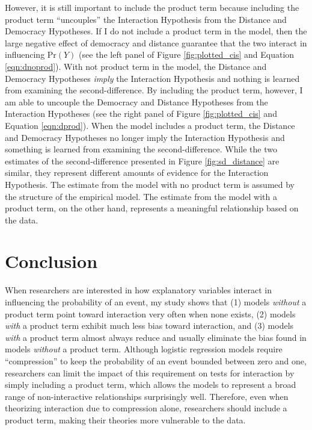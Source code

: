 \documentclass[12pt]{article}
\begin{document}
However, it is still important to include the product term because including the product term ``uncouples'' the Interaction Hypothesis from the Distance and Democracy Hypotheses. If I do not include a product term in the model, then the large negative effect of democracy and distance guarantee that the two interact in influencing $\text{Pr}(Y)$ (see the left panel of Figure \ref{fig:plotted_cis} and Equation \ref{eqn:dnoprod}). With not product term in the model, the Distance and Democracy Hypotheses \textit{imply} the Interaction Hypothesis and nothing is learned from examining the second-difference. By including the product term, however, I am able to uncouple the Democracy and Distance Hypotheses from the Interaction Hypotheses (see the right panel of Figure \ref{fig:plotted_cis} and Equation \ref{eqn:dprod}). When the model includes a product term, the Distance and Democracy Hypotheses no longer imply the Interaction Hypothesis and something is learned from examining the second-difference. While the two estimates of the second-difference presented in Figure \ref{fig:sd_distance} are similar, they represent different amounts of evidence for the Interaction Hypothesis. The estimate from the model with no product term is assumed by the structure of the empirical model. The estimate from the model with a product term, on the other hand, represents a meaningful relationship based on the data. 
\section*{Conclusion}

When researchers are interested in how explanatory variables interact in influencing the probability of an event, my study shows that (1) models \textit{without} a product term point toward interaction very often when none exists, (2) models \textit{with} a product term exhibit much less bias toward interaction, and (3) models \textit{with} a product term almost always reduce and usually eliminate the bias found in models \textit{without }a product term.  Although logistic regression models require ``compression''  to keep the probability of an event bounded between zero and one, researchers can limit the impact of this requirement on tests for interaction by simply including a product term, which allows the models to represent a  broad range of non-interactive relationships surprisingly well. Therefore, even when theorizing interaction due to compression alone, researchers should include a product term, making their theories more vulnerable to the data.\normalsize
\end{document}
